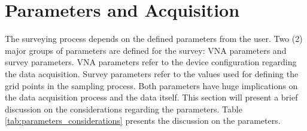 \documentclass{article}
\begin{document}
\newpage
\section{Parameters and Acquisition}
The surveying process depends on the defined parameters from the user. Two (2) major groups of parameters are defined for the survey: VNA parameters and survey parameters. VNA parameters refer to the device configuration regarding the data acquisition. Survey parameters refer to the values used for defining the grid points in the sampling process. Both parameters have huge implications on the data acquisition process and the data itself. This section will present a brief discussion on the considerations regarding the parameters. Table \ref{tab:parameters_considerations} presents the discussion on the parameters.
\end{document}
